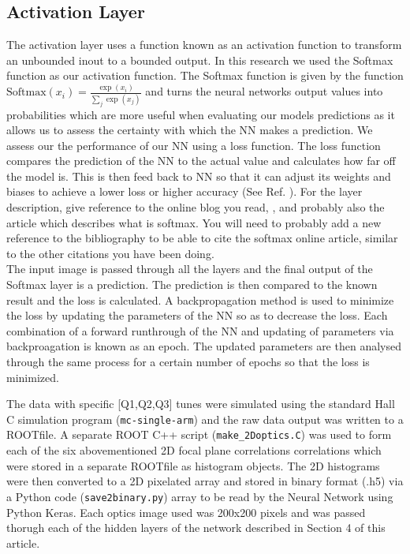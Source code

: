 \documentclass[conference]{IEEEtran}
\begin{document}
\subsection{Activation Layer}
The activation layer uses a function known as an activation function to transform an unbounded inout to a bounded output. In this research we used the Softmax function as our activation function. The Softmax function is given by the function $\text{Softmax}(x_{i}) = \frac{\exp(x_i)}{\sum_j \exp(x_j)}$ and turns the neural networks output values into probabilities which are more useful when evaluating our models predictions as it allows us to assess the certainty with which the NN makes a prediction. We assess our the performance of our NN using a loss function. The loss function compares the prediction of the NN to the actual value and calculates how far off the model is. This is then feed back to NN so that it can adjust its weights and biases to achieve a lower loss or higher accuracy (See Ref. \cite{Softmax}). For the layer description, give reference to the online blog you read, \cite{CNNPart1_VZ_2019}, and probably also
the article which describes what is softmax. You will need to probably add a new reference to the bibliography to be able to cite the softmax online article, similar to the other citations you have been doing.\\

The input image is passed through all the layers and the final output of the Softmax layer is a prediction. The prediction is then compared to the known result and the loss is calculated. A backpropagation method is used to minimize the loss by updating the parameters of the NN so as to decrease the loss. Each combination of a forward runthrough of  the NN and updating of parameters via backproagation is known as an epoch. The updated parameters are then analysed through the same process for a certain number of epochs so that the loss is minimized.

The data with specific [Q1,Q2,Q3] tunes were simulated using the standard Hall C simulation program (\texttt{mc-single-arm})
and the raw data output was written to a ROOTfile. A separate ROOT C++ script (\texttt{make\_2Doptics.C}) was used to form each of
the six abovementioned 2D focal plane correlations correlations which were stored in a separate ROOTfile as histogram objects.
The 2D histograms were then converted to a 2D pixelated array and stored in binary format (.h5) via a Python code (\texttt{save2binary.py})
array to be read by the Neural Network using Python Keras. Each optics image used was 200x200 pixels and was passed thorugh each of
the hidden layers of the network described in Section 4 of this article.
\end{document}
